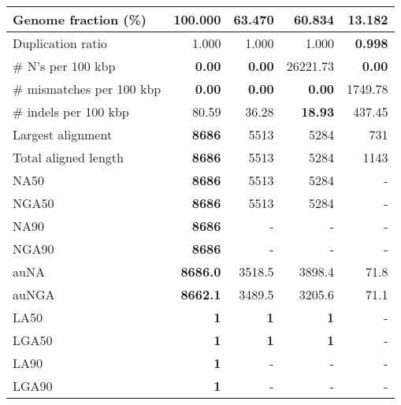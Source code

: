 \documentclass[12pt,a4paper]{article}
\begin{document}
\begin{table}[ht]
\begin{center}
\begin{tabular}{|l*{4}{|r}|}
Genome fraction (\%) & {\bf 100.000} & 63.470 & 60.834 & 13.182 \\ \hline
Duplication ratio & 1.000 & 1.000 & 1.000 & {\bf 0.998} \\ \hline
\# N's per 100 kbp & {\bf 0.00} & {\bf 0.00} & 26221.73 & {\bf 0.00} \\ \hline
\# mismatches per 100 kbp & {\bf 0.00} & {\bf 0.00} & {\bf 0.00} & 1749.78 \\ \hline
\# indels per 100 kbp & 80.59 & 36.28 & {\bf 18.93} & 437.45 \\ \hline
Largest alignment & {\bf 8686} & 5513 & 5284 & 731 \\ \hline
Total aligned length & {\bf 8686} & 5513 & 5284 & 1143 \\ \hline
NA50 & {\bf 8686} & 5513 & 5284 & - \\ \hline
NGA50 & {\bf 8686} & 5513 & 5284 & - \\ \hline
NA90 & {\bf 8686} & - & - & - \\ \hline
NGA90 & {\bf 8686} & - & - & - \\ \hline
auNA & {\bf 8686.0} & 3518.5 & 3898.4 & 71.8 \\ \hline
auNGA & {\bf 8662.1} & 3489.5 & 3205.6 & 71.1 \\ \hline
LA50 & {\bf 1} & {\bf 1} & {\bf 1} & - \\ \hline
LGA50 & {\bf 1} & {\bf 1} & {\bf 1} & - \\ \hline
LA90 & {\bf 1} & - & - & - \\ \hline
LGA90 & {\bf 1} & - & - & - \\ \hline
\end{tabular}
\end{center}
\end{table}
\end{document}
